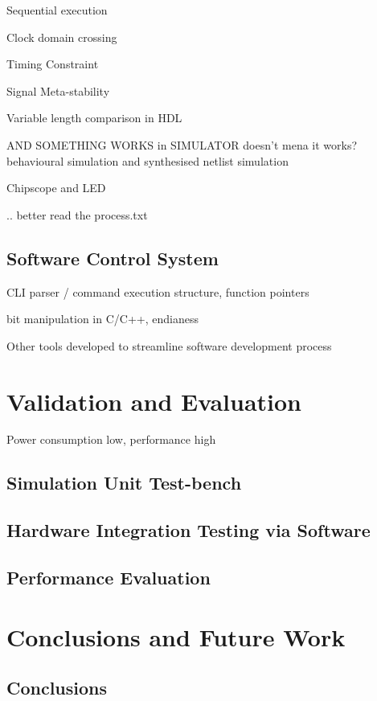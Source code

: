 \documentclass[a4paper]{report}
\begin{document}
Sequential execution

Clock domain crossing

Timing Constraint

Signal Meta-stability

Variable length comparison in HDL

AND SOMETHING WORKS in SIMULATOR doesn't mena it works?
behavioural simulation and synthesised netlist simulation

Chipscope and LED

.. better read the process.txt

\section{Software Control System}

CLI parser / command execution structure, function pointers

bit manipulation in C/C++, endianess

Other tools developed to streamline software development process

\chapter{Validation and Evaluation}

Power consumption low, performance high

\section{Simulation Unit Test-bench}

\section{Hardware Integration Testing via Software}

\section{Performance Evaluation}

\chapter{Conclusions and Future Work}

\section{Conclusions}
\end{document}

